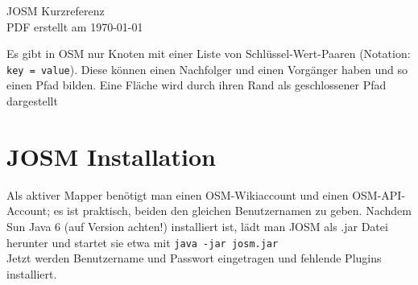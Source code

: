 \documentclass[a4paper,11pt,notumble]{leaflet}
\begin{document}
 

{\Huge JOSM Kurzreferenz}\\
{\small PDF erstellt am \today}

Es gibt in OSM nur Knoten mit einer Liste von Schlüssel-Wert-Paaren (Notation: \texttt{key\,=\,value}).
Diese können einen Nachfolger und einen Vorgänger haben und so einen Pfad bilden.
Eine Fläche wird durch ihren Rand als geschlossener Pfad dargestellt

\section*{JOSM Installation} 
Als aktiver Mapper benötigt man einen OSM-Wikiaccount 
und einen OSM-API-Account; es ist praktisch, beiden den gleichen Benutzernamen zu geben.
Nachdem Sun Java 6 (auf Version achten!) installiert ist, lädt man JOSM als .jar Datei herunter und startet sie
etwa mit \texttt{java -jar josm.jar}\\
Jetzt werden Benutzername und Passwort eingetragen und fehlende Plugins installiert.
\end{document}
